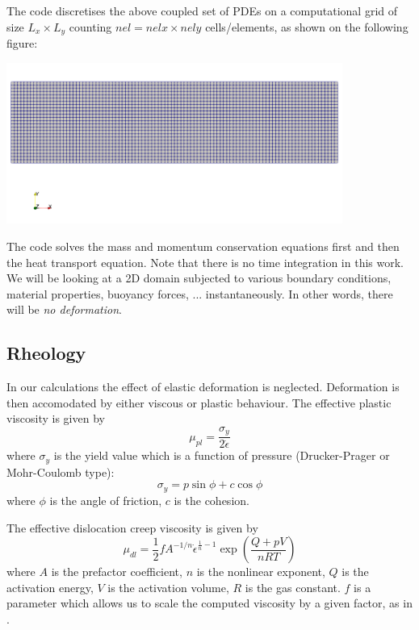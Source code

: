 \documentclass[a4paper]{article}
\begin{document}
The code discretises the above coupled set of PDEs on a computational grid of size $L_x\times L_y$ counting $nel=nelx \times nely$ cells/elements, as shown on the following figure:

\begin{center}
\includegraphics[width=11cm]{images/grid}
\end{center}

The code solves the mass and momentum conservation equations first and then the heat transport equation. 
Note that there is no time integration in this work. We will be looking at a 2D domain subjected to various boundary conditions, material properties, buoyancy forces, ... instantaneously. In other words, there will be {\it no deformation}.



\subsection{Rheology}

In our calculations the effect of elastic deformation is neglected. Deformation is then accomodated by either viscous or plastic behaviour. The effective plastic viscosity is given by \cite{thie11,nabu15,spmw16}
\[
\mu_{pl} = \frac{\sigma_y}{2 \dot{\epsilon}}
\]
where $\sigma_y$ is the yield value which is a function of pressure (Drucker-Prager or Mohr-Coulomb type):
\[
\sigma_y = p \sin \phi + c \cos \phi
\]
where $\phi$ is the angle of friction, $c$ is the cohesion. 

The effective dislocation creep viscosity is given by \cite{thie11}
\[
\mu_{dl}=\frac{1}{2} f A^{-1/n} \dot{\epsilon}^{\frac{1}{n}-1} \exp \left( \frac{Q+pV}{nRT}  \right)
\]
where $A$ is the prefactor coefficient, $n$ is the nonlinear exponent, $Q$ is the activation energy, $V$ is the activation volume, $R$ is the gas constant. $f$ is a parameter which allows us to scale the computed viscosity by a given factor, as in \cite{hube11}.
\end{document}
